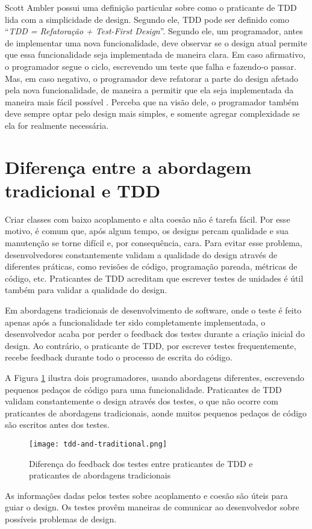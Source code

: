 Scott Ambler possui uma definição particular sobre como o praticante de TDD lida
com a simplicidade de design. Segundo ele, TDD pode ser definido como
``\textit{TDD = Refatoração + Test-First Design}''. Segundo ele, um programador,
antes de implementar uma nova funcionalidade, deve observar se o design atual
permite que essa funcionalidade seja implementada de maneira clara. Em caso
afirmativo, o programador segue o ciclo, escrevendo um teste que falha e
fazendo-o passar. Mas, em caso negativo, o programador deve refatorar a parte do
design afetado pela nova funcionalidade, de maneira a permitir que ela seja
implementada da maneira mais fácil possível \cite{wambler-tdd}. Perceba que na
visão dele, o programador também deve sempre optar pelo design mais simples, e
somente agregar complexidade se ela for realmente necessária.

\section{Diferença entre a abordagem tradicional e TDD}
\label{sec:diferencas-tdd-e-tradicional}


Criar classes com baixo acoplamento e alta coesão não é tarefa fácil. Por esse
motivo, é comum que, após algum tempo, os designs percam qualidade e sua
manutenção se torne difícil e, por consequência, cara.
Para evitar esse problema, desenvolvedores constantemente validam a qualidade do
design através de diferentes práticas, como revisões de código, programação
pareada, métricas de código, etc. Praticantes de TDD acreditam que escrever
testes de unidades é útil também para validar a qualidade do design.

Em abordagens tradicionais de desenvolvimento de software, onde o teste é feito
apenas após a funcionalidade ter sido completamente implementada, o
desenvolvedor acaba por perder o feedback dos testes durante a criação inicial
do design. Ao contrário, o praticante de TDD, por escrever testes
frequentemente, recebe feedback durante todo o processo de escrita do código.

A Figura \ref{fig:tdd-feedback} ilustra dois programadores, usando
abordagens diferentes, escrevendo pequenos pedaços de código para uma
funcionalidade. Praticantes de TDD validam constantemente o design através dos
testes, o que não ocorre com praticantes de abordagens tradicionais, aonde
muitos pequenos pedaços de código são escritos antes dos testes.

\begin{figure}[H]
  \centering
  \texttt{[image: tdd-and-traditional.png]}
  \caption{Diferença do feedback dos testes entre praticantes de TDD e
  praticantes de abordagens tradicionais}
  \label{fig:tdd-feedback}
\end{figure}

As informações dadas pelos testes sobre acoplamento e coesão são úteis para
guiar o design. Os testes provêm maneiras de comunicar ao desenvolvedor sobre
possíveis problemas de design. 
